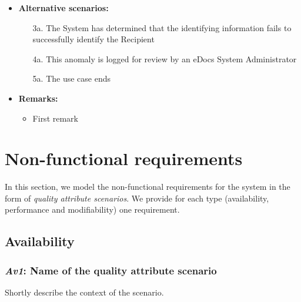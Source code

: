\documentclass[a4paper,10pt]{article}
\begin{document}
\begin{itemize}
	\item \textbf{Alternative scenarios:} 
	\begin{enumerate}
		\item [3a.] The System has determined that the identifying information fails to successfully identify the Recipient
		\item [4a.] This anomaly is logged for review by an eDocs System Administrator
		\item [5a.] The use case ends
	\end{enumerate}
	
	\item \textbf{Remarks:}
	\begin{itemize}
		\item First remark
	\end{itemize}
\end{itemize}

\section{Non-functional requirements}\label{sec:non-functional}
In this section, we model the non-functional requirements for the system in the
form of \emph{quality attribute scenarios}. We provide for each type
(availability, performance and modifiability) one requirement.

\subsection{Availability}
\subsubsection{\emph{Av1}: Name of the quality attribute scenario}
Shortly describe the context of the scenario.
\end{document}
